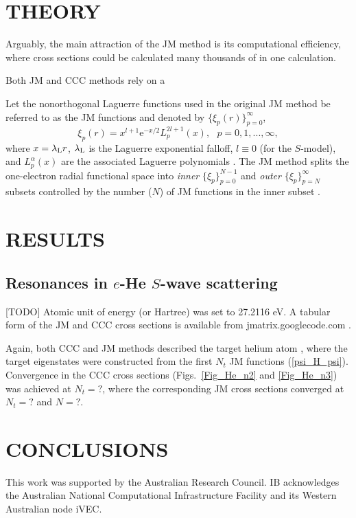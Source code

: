 \documentclass[aip
, pra
, showpacs
, aps
, twocolumn
, groupedaddress
, floatfix
]{revtex4}
\begin{document}
\section{THEORY}

Arguably, the main attraction of the JM method is its computational efficiency, where cross sections could be calculated many thousands of in one calculation.

Both JM and CCC methods rely on a

Let the nonorthogonal Laguerre functions used in the original JM method \cite{HY74p1201,BR76p1491}
be referred to as the JM functions and denoted by $\{\xi_p(r)\}_{p=0}^\infty$,
\[
\xi_p(r) = x^{l+1} \mbox{e}^{-x /2}
L_p^{2l+1}(x), \ \ \ p = 0, 1, ..., \infty,
\]
where $x=\lambda_{\rm L} r$,  $\lambda_{\rm L}$ is the Laguerre exponential falloff,
$l \equiv 0$ (for the $S$-model), and $L_p^{\alpha}(x)$ are the associated Laguerre polynomials \cite{abramowitz}.
The JM method splits the one-electron radial functional space into {\em inner} $\{\xi_p\}_{p=0}^{N-1}$
and {\em outer} $\{\xi_p\}_{p=N}^\infty$
subsets controlled by the number ($N$) of JM functions in the inner subset \cite{HY74p1201,BR76p1491}.




\section{RESULTS}

\subsection{Resonances in $e$-He $S$-wave scattering}


[TODO]
Atomic unit of energy (or Hartree) was set to 27.2116 eV. A tabular
form of the JM and CCC cross sections is available from jmatrix.googlecode.com .



Again, both CCC and JM methods described the target helium atom
, where the target eigenstates were constructed from the first $N_t$ JM functions (\ref{psi_H_psi}). Convergence in the CCC cross sections
(Figs.~\ref{Fig_He_n2} and \ref{Fig_He_n3}) was achieved at $N_t=?$, where the corresponding JM cross sections
converged at $N_t=?$ and $N=?$.






\section{CONCLUSIONS}





\begin{acknowledgments}
This work was supported by the Australian Research Council. IB
acknowledges the Australian National Computational Infrastructure
Facility and its Western Australian node iVEC.
\end{acknowledgments}





\end{document}
